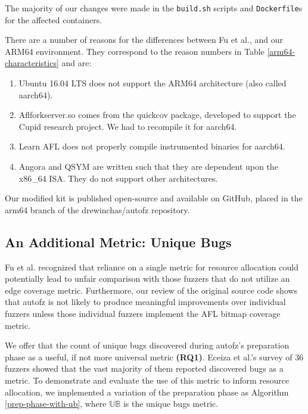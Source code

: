 The majority of our changes were made in the \texttt{build.sh} scripts and \texttt{Dockerfile}s
for the affected containers.

There are a number of reasons for the differences between Fu et al.,
and our ARM64 environment. They correspond to the reason numbers in Table 
\ref{arm64-characteristics} and are:

\begin{enumerate}
    \item Ubuntu 16.04 LTS does not support the ARM64 architecture (also called 
    aarch64).
    \item Aflforkserver.so comes from the quickcov package, developed to support 
    the Cupid research project\cite{guler_cupid_2020}. We had to recompile it for aarch64.
    \item Learn AFL does not properly compile instrumented binaries for aarch64.
    \item Angora and QSYM are written such that they are dependent upon the x86\_64 ISA.
    They do not support other architectures.
\end{enumerate}

Our modified kit is published open-source and available on GitHub, 
\cite{noauthor_drewinchasautofz_nodate} placed in the arm64 branch 
of the drewinchas/autofz repository.

\subsection{An Additional Metric: Unique Bugs}

Fu et al.\cite{fu_autofz_2023} recognized that reliance on a single metric for resource 
allocation could potentially lead to unfair comparison with those fuzzers that do not 
utilize an edge coverage metric. Furthermore, our review of the original source 
code shows that autofz is not likely to produce meaningful improvements over individual 
fuzzers unless those individual fuzzers implement the AFL bitmap coverage metric.

We offer that the count of unique bugs discovered during autofz's preparation phase 
as a useful, if not more universal metric \textbf{(RQ1)}. Eceiza et al.\cite{eceiza_improving_2023}'s 
survey of 36 fuzzers showed that the vast majority of them reported discovered 
bugs as a metric. To demonstrate and evaluate the use of this metric to inform resource allocation, we 
implemented a variation of the preparation phase as Algorithm \ref{prep-phase-with-ub}, 
where $\mathbb{UB}$ is the unique bugs metric.

